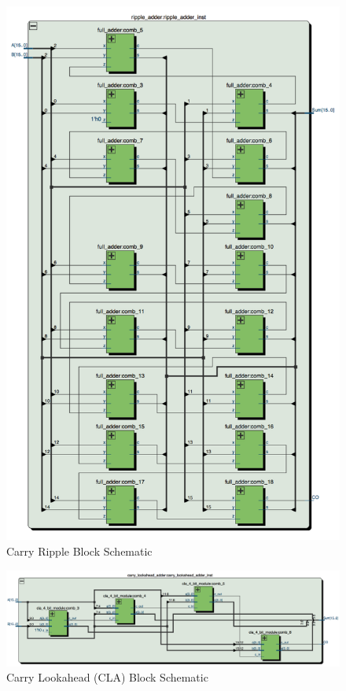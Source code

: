 \documentclass[journal, twocolumn, final,11pt,letterpaper]{IEEEtran}
\begin{document}
\begin{figure} [htbp]
	\centering
	\includegraphics[scale=0.4]{carry-ripple-block-schematic.png}
	\caption{Carry Ripple Block Schematic\label{fig:carry-ripple-block-schematic}}
\end{figure}

\begin{figure} [htbp]
	\centering
	\includegraphics[scale=0.4]{carry-lookahead-block-schematic.png}
	\caption{Carry Lookahead (CLA) Block Schematic\label{fig:carry-lookahead-block-schematic}}
\end{figure}
\end{document}
